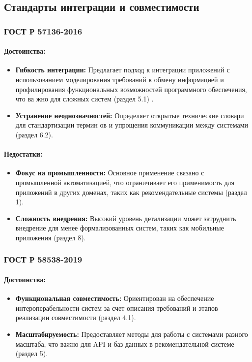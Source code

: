 \subsection{Стандарты интеграции и совместимости}


\subsubsection*{ГОСТ Р 57136-2016}

\paragraph{Достоинства:}
\begin{itemize}
    \item \textbf{Гибкость интеграции:} Предлагает подход к интеграции приложений с использованием моделирования
    требований к обмену информацией и профилирования функциональных возможностей программного обеспечения, что ва
    жно для сложных систем (раздел 5.1) .
    \item \textbf{Устранение неоднозначностей:} Определяет открытые технические словари для стандартизации термин
    ов и упрощения коммуникации между системами (раздел 6.2).
\end{itemize}

\paragraph{Недостатки:}
\begin{itemize}
    \item \textbf{Фокус на промышленности:} Основное применение связано с промышленной автоматизацией, что
    ограничивает его применимость для приложений в других доменах, таких как рекомендательные системы (раздел 1).
    \item \textbf{Сложность внедрения:} Высокий уровень детализации может затруднить внедрение для менее
    формализованных систем, таких как мобильные приложения (раздел 8).
\end{itemize}

\subsubsection*{ГОСТ Р 58538-2019}

\paragraph{Достоинства:}
\begin{itemize}
    \item \textbf{Функциональная совместимость:} Ориентирован на обеспечение интероперабельности систем за счет
    описания требований и этапов реализации совместимости (раздел 4.1).
    \item \textbf{Масштабируемость:} Предоставляет методы для работы с системами разного масштаба, что важно
    для API и баз данных в рекомендательной системе (раздел 5).
\end{itemize}

